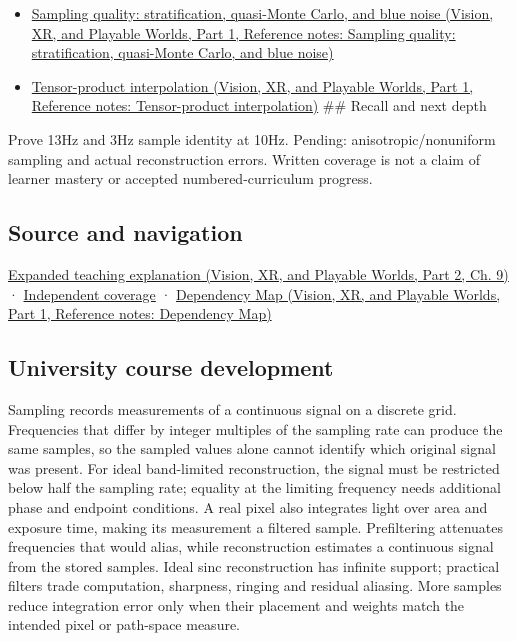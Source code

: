 \begin{itemize}
\item
  \href{../07-Vision-XR-and-Playable-Worlds-P01/main.pdf\#nameddest=appendix-9f693ffd82bc}{Sampling quality: stratification, quasi-Monte Carlo, and blue noise (Vision, XR, and Playable Worlds, Part 1, Reference notes: Sampling quality: stratification, quasi-Monte Carlo, and blue noise)}
\item
  \href{../07-Vision-XR-and-Playable-Worlds-P01/main.pdf\#nameddest=appendix-0a09b6dfdc86}{Tensor-product interpolation (Vision, XR, and Playable Worlds, Part 1, Reference notes: Tensor-product interpolation)} \#\# Recall and next depth
\end{itemize}

Prove 13Hz and 3Hz sample identity at 10Hz. Pending: anisotropic/nonuniform sampling and actual reconstruction errors. Written coverage is not a claim of learner mastery or accepted numbered-curriculum progress.

\subsection{Source and navigation}\label{appendix-6a7869dd79a6-source-and-navigation}

\hypertarget{appendix-6a7869dd79a6-source-and-navigation}{}

\href{../07-Vision-XR-and-Playable-Worlds-P02/main.pdf\#nameddest=04-visual-computing-ii-ch042-sampling-is-a-question-of-what-remains-distinguishable}{Expanded teaching explanation (Vision, XR, and Playable Worlds, Part 2, Ch. 9)} · \hyperref[appendix-fd090d982a15-xr01---independent-seeing-and-representation-source]{Independent coverage} · \href{../07-Vision-XR-and-Playable-Worlds-P01/main.pdf\#nameddest=appendix-4ad47bdd269a}{Dependency Map (Vision, XR, and Playable Worlds, Part 1, Reference notes: Dependency Map)}

\subsection{University course development}\label{appendix-6a7869dd79a6-university-course-development}

\hypertarget{appendix-6a7869dd79a6-university-course-development}{}

Sampling records measurements of a continuous signal on a discrete grid. Frequencies that differ by integer multiples of the sampling rate can produce the same samples, so the sampled values alone cannot identify which original signal was present. For ideal band-limited reconstruction, the signal must be restricted below half the sampling rate; equality at the limiting frequency needs additional phase and endpoint conditions. A real pixel also integrates light over area and exposure time, making its measurement a filtered sample. Prefiltering attenuates frequencies that would alias, while reconstruction estimates a continuous signal from the stored samples. Ideal sinc reconstruction has infinite support; practical filters trade computation, sharpness, ringing and residual aliasing. More samples reduce integration error only when their placement and weights match the intended pixel or path-space measure.

